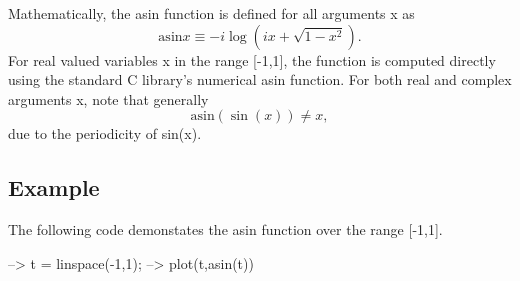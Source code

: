 Mathematically, the {\ttfamily asin} function is defined for all arguments {\ttfamily x} as \[ \mathrm{asin} x \equiv - i \log \left(i x + \sqrt{1-x^2}\right). \] For real valued variables {\ttfamily x} in the range {\ttfamily \mbox{[}-\/1,1\mbox{]}}, the function is computed directly using the standard C library's numerical {\ttfamily asin} function. For both real and complex arguments {\ttfamily x}, note that generally \[ \mathrm{asin}(\sin(x)) \neq x, \] due to the periodicity of {\ttfamily sin(x)}. \hypertarget{variables_struct_Example}{}\subsection{Example}\label{variables_struct_Example}
The following code demonstates the {\ttfamily asin} function over the range {\ttfamily \mbox{[}-\/1,1\mbox{]}}.


\begin{DoxyVerbInclude}
--> t = linspace(-1,1);
--> plot(t,asin(t))
\end{DoxyVerbInclude}


